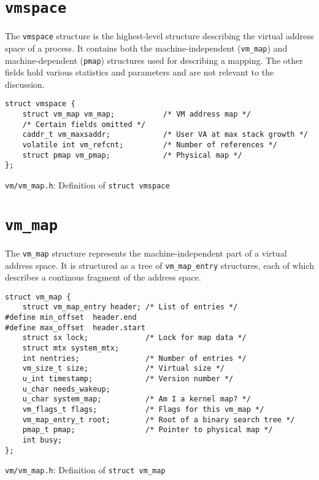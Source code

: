 \documentclass[shortabstract, english]{iithesis}
\begin{document}
\section{\texttt{vmspace}}

The \texttt{vmspace} structure is the highest-level structure describing the
virtual address space of a process. It contains both the machine-independent
(\texttt{vm_map}) and machine-dependent (\texttt{pmap}) structures used for
describing a mapping. The other fields hold various statistics and parameters
and are not relevant to the discussion.

\begin{listing}[H]
\begin{verbatim}
struct vmspace {
    struct vm_map vm_map;           /* VM address map */
    /* Certain fields omitted */
    caddr_t vm_maxsaddr;            /* User VA at max stack growth */
    volatile int vm_refcnt;         /* Number of references */
    struct pmap vm_pmap;            /* Physical map */
};
\end{verbatim}
\caption{\texttt{vm/vm\_map.h}: Definition of \texttt{struct vmspace}}
\end{listing}

\section{\texttt{vm_map}}

The \texttt{vm_map} structure represents the machine-independent part of a
virtual address space. It is structured as a tree of \texttt{vm_map_entry}
structures, each of which describes a continous fragment of the address space.


\begin{listing}[H]
\begin{verbatim}
struct vm_map {
    struct vm_map_entry header; /* List of entries */
#define min_offset  header.end
#define max_offset  header.start
    struct sx lock;             /* Lock for map data */
    struct mtx system_mtx;
    int nentries;               /* Number of entries */
    vm_size_t size;             /* Virtual size */
    u_int timestamp;            /* Version number */
    u_char needs_wakeup;
    u_char system_map;          /* Am I a kernel map? */
    vm_flags_t flags;           /* Flags for this vm_map */
    vm_map_entry_t root;        /* Root of a binary search tree */
    pmap_t pmap;                /* Pointer to physical map */
    int busy;
};
\end{verbatim}
\caption{\texttt{vm/vm\_map.h}: Definition of \texttt{struct vm_map}}
\end{listing}
\end{document}
